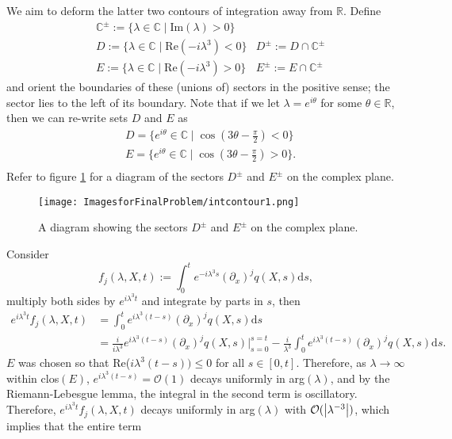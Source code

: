We aim to deform the latter two contours of integration away from $\mathbb{R}$. Define
\begin{align*}
    &\mathbb{C}^{\pm} := \{\lambda \in \mathbb{C} \mid \mbox{Im}(\lambda) > 0 \} \\
    &D := \{ \lambda \in \mathbb{C} \mid \mbox{Re}(-i\lambda^3) < 0 \} &D^{\pm} := D \cap \mathbb{C}^{\pm} \\
    &E := \{ \lambda \in \mathbb{C} \mid \mbox{Re}(-i\lambda^3) > 0 \} &E^{\pm} := E \cap \mathbb{C}^{\pm}
\end{align*}
and orient the boundaries of these (unions of) sectors in the positive sense; the sector lies to the left of its boundary.
Note that if we let $\lambda = e^{i\theta}$ for some $\theta \in \mathbb{R}$, then we can re-write sets $D$ and $E$ as
\begin{align*}
    &D = \{ e^{i\theta} \in \mathbb{C} \mid \cos(3\theta - \frac{\pi}{2}) < 0 \} \\
    &E = \{ e^{i\theta} \in \mathbb{C} \mid \cos(3\theta - \frac{\pi}{2}) > 0 \}. \\
\end{align*}
Refer to figure \ref{fig:intcontour} for a diagram of the sectors $D^{\pm}$ and $E^{\pm}$ on the complex plane.
\begin{figure}
\texttt{[image: ImagesforFinalProblem/intcontour1.png]}
\caption{A diagram showing the sectors $D^{\pm}$ and $E^{\pm}$ on the complex plane.}
\centering\label{fig:intcontour}
\end{figure}
\newpage Consider
$$f_j(\lambda,X,t) := \int_0^t e^{-i\lambda^3 s}(\partial_x)^j q(X,s) \mathrm{d}s,$$
multiply both sides by $e^{i\lambda^3 t}$ and integrate by parts in $s$, then
\begin{align*}
    e^{i\lambda^3 t}f_j(\lambda,X,t) &= \int_0^t e^{i\lambda^3 (t-s)}(\partial_x)^j q(X,s) \mathrm{d}s \\
    &= \frac{i}{i\lambda^3} e^{i\lambda^3 (t-s)}(\partial_x)^j q(X,s) \bigg\rvert_{s=0}^{s=t} - \frac{i}{\lambda^3}\int_0^t e^{i\lambda^3 (t-s)}(\partial_x)^j q(X,s) \mathrm{d}s. 
\end{align*}
$E$ was chosen so that Re($i\lambda^3(t-s)) \leq 0$ for all $s \in [0,t]$. Therefore, as $\lambda \rightarrow \infty$ within clos$(E)$, $e^{i\lambda^3 (t-s)} = \mathcal{O}(1)$ decays uniformly in arg$(\lambda)$, and by the Riemann-Lebesgue lemma, the integral in the second term is oscillatory. Therefore, $e^{i\lambda^3 t}f_j(\lambda,X,t)$ decays uniformly in arg$(\lambda)$ with $\mathcal{O}(\left\lvert\lambda^{-3}\right\rvert)$, which implies that the entire term
